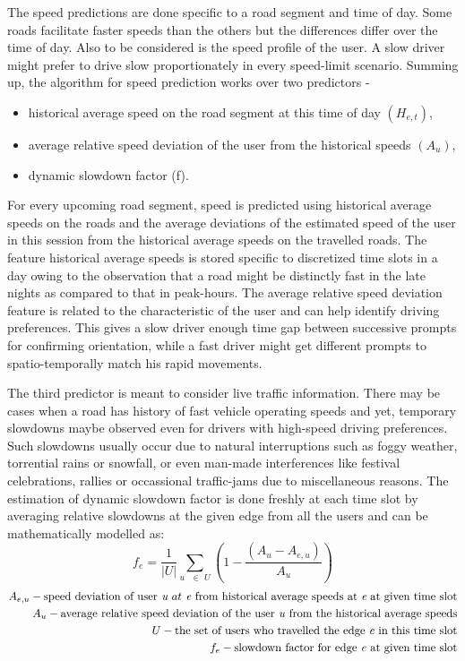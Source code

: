 \documentclass{iitkthesis}
\begin{document}
The speed predictions are done specific to a road segment and time of day. Some roads facilitate faster speeds than the others but the differences differ over the time of day.
Also to be considered is the speed profile of the user. A slow driver might prefer to drive slow proportionately in every speed-limit scenario. Summing up, the algorithm for speed prediction works over two predictors - 
\begin{itemize}
\item historical average speed on the road segment at this time of day $(H_{e,t})$,
\item average relative speed deviation of the user from the historical speeds $({A_u})$,
\item dynamic slowdown factor (f).
\end{itemize}

For every upcoming road segment, speed is predicted using historical average speeds on the roads and the average deviations of the estimated speed of the user in this session from the historical average speeds on the travelled roads. The feature historical average speeds is stored specific to discretized time slots in a day owing to the observation that a road might be distinctly fast in the late nights as compared to that in peak-hours. The average relative speed deviation feature is related to the characteristic of the user and can help identify driving preferences. This gives a slow driver enough time gap between successive prompts for confirming orientation, while a fast driver might get different prompts to spatio-temporally match his rapid movements.  

The third predictor is meant to consider live traffic information. There may be cases when a road has history of fast vehicle operating speeds and yet, temporary slowdowns maybe observed even for drivers with high-speed driving preferences. Such slowdowns usually occur due to natural interruptions such as foggy weather, torrential rains or snowfall, or even man-made interferences like festival celebrations, rallies or occassional traffic-jams due to miscellaneous reasons. The estimation of dynamic slowdown factor is done freshly at each time slot by averaging relative slowdowns at the given edge from all the users and can be mathematically modelled as:
\[\displaystyle f_{e} = \frac{1}{|U|}\sum_{u \text{ } \in \textit{ U}}(1-\frac{(A_u - A_{e,u})}{A_u})\]  
\begin{align*}
A_{e,u} - \text{speed deviation of user} \textit{ u } at \textit{ e } \text{from historical average speeds at }\textit{e} \text{ at given time slot} \\
A_u - \text{average relative speed deviation of the user \textit{u} from the historical average speeds} \\
U - \text{the set of users who travelled the edge \textit{e} in this time slot} \\
f_e - \text{slowdown factor for edge \textit{e} at given time slot}
\end{align*}
\end{document}
